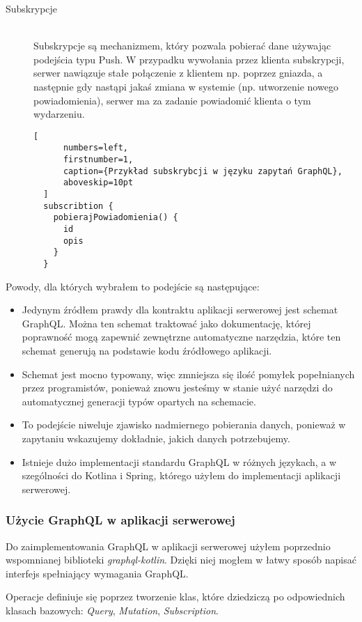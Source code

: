 \begin{description}
\item[Subskrypcje] \hfill \\ Subskrypcje są mechanizmem, który pozwala pobierać dane używając podejścia typu Push. W przypadku wywołania przez klienta subskrypcji, serwer nawiązuje stałe połączenie z klientem np. poprzez gniazda, a następnie gdy nastąpi jakaś zmiana w systemie (np. utworzenie nowego powiadomienia), serwer ma za zadanie powiadomić klienta o tym wydarzeniu.
  \begin{addmargin}[6mm]{0mm}
  \begin{lstlisting}[
      numbers=left,
      firstnumber=1,
      caption={Przykład subskrybcji w języku zapytań GraphQL},
      aboveskip=10pt
  ]
  subscribtion {
    pobierajPowiadomienia() {
      id
      opis
    }
  }
  \end{lstlisting}
  \end{addmargin}
\end{description}
Powody, dla których wybrałem to podejście są następujące:
\begin{itemize}
  \item Jedynym źródłem prawdy dla kontraktu aplikacji serwerowej jest schemat GraphQL. Można ten schemat traktować jako dokumentację, której poprawność mogą zapewnić zewnętrzne automatyczne narzędzia, które ten schemat generują na podstawie kodu źródłowego aplikacji.
  \item Schemat jest mocno typowany, więc zmniejsza się ilość pomyłek popełnianych przez programistów, ponieważ znowu jesteśmy w stanie użyć narzędzi do automatycznej generacji typów opartych na schemacie.
  \item To podejście niweluje zjawisko nadmiernego pobierania danych, ponieważ w zapytaniu wskazujemy dokładnie, jakich danych potrzebujemy.
  \item Istnieje dużo implementacji standardu GraphQL w różnych językach, a w szególności do Kotlina i Spring, którego użyłem do implementacji aplikacji serwerowej.
\end{itemize}

\subsubsection{Użycie GraphQL w aplikacji serwerowej}
Do zaimplementowania GraphQL w aplikacji serwerowej użyłem poprzednio wspomnianej biblioteki \emph{graphql-kotlin}. Dzięki niej mogłem w łatwy sposób napisać interfejs spełniający wymagania GraphQL.

Operacje definiuje się poprzez tworzenie klas, które dziedziczą po odpowiednich klasach bazowych: \emph{Query}, \emph{Mutation}, \emph{Subscription}.

